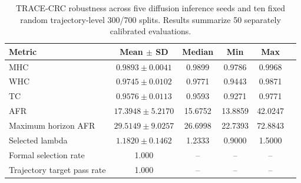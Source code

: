 \begin{table}[!htbp]
\centering
\scriptsize
\caption{TRACE-CRC robustness across five diffusion inference seeds and ten fixed random trajectory-level 300/700 splits. Results summarize 50 separately calibrated evaluations.}
\label{tab:trace-seed-split-robustness}
\begin{tabular}{lccccc}
\toprule
Metric & Mean $\pm$ SD & Median & Min & Max \\
\midrule
MHC & $0.9893 \pm 0.0041$ & 0.9899 & 0.9786 & 0.9968 \\
WHC & $0.9745 \pm 0.0102$ & 0.9771 & 0.9443 & 0.9871 \\
TC & $0.9576 \pm 0.0113$ & 0.9593 & 0.9271 & 0.9771 \\
AFR & $17.3948 \pm 5.2170$ & 15.6752 & 13.8859 & 42.0247 \\
Maximum horizon AFR & $29.5149 \pm 9.0257$ & 26.6998 & 22.7393 & 72.8843 \\
Selected lambda & $1.1820 \pm 0.1462$ & 1.2333 & 0.9000 & 1.5000 \\
\midrule
Formal selection rate & 1.000 & -- & -- & -- \\
Trajectory target pass rate & 1.000 & -- & -- & -- \\
\bottomrule
\end{tabular}
\end{table}
